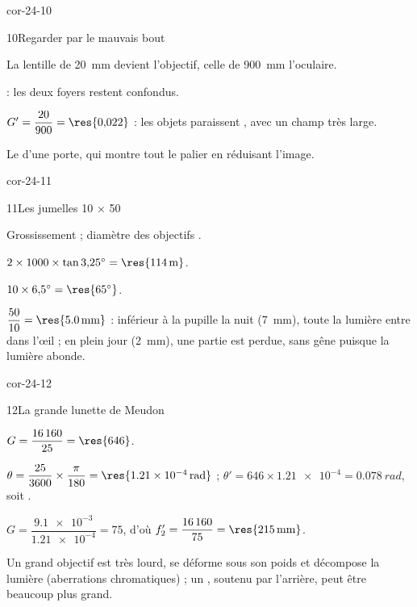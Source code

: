 \begin{blocLivre}{cor-24-10}
\begin{corrige}{10}{Regarder par le mauvais bout}
\begin{questions}
\item La lentille de \qty{20}{mm} devient l'objectif, celle de \qty{900}{mm} l'oculaire.
\item {} : les deux foyers restent confondus.
\item $G'=\dfrac{20}{900}=\res{0{,}022}$ : les objets paraissent , avec un champ très large.
\item Le  d'une porte, qui montre tout le palier en réduisant l'image.
\end{questions}
\end{corrige}
\end{blocLivre}
\begin{blocLivre}{cor-24-11}
\begin{corrige}{11}{Les jumelles 10 × 50}
\begin{questions}
\item Grossissement  ; diamètre des objectifs .
\item $2\times1000\times\tan3{,}25^\circ=\res{\qty{114}{m}}$.
\item $10\times6{,}5^\circ=\res{65^\circ}$.
\item $\dfrac{50}{10}=\res{\qty{5,0}{mm}}$ : inférieur à la pupille la nuit (\qty{7}{mm}), toute la lumière entre dans l'œil ; en
plein jour (\qty{2}{mm}), une partie est perdue, sans gêne puisque la lumière abonde.
\end{questions}
\end{corrige}
\end{blocLivre}
\begin{blocLivre}{cor-24-12}
\begin{corrige}{12}{La grande lunette de Meudon}
\begin{questions}
\item $G=\dfrac{\num{16160}}{25}=\res{646}$.
\item $\theta=\dfrac{25}{3600}\times\dfrac{\pi}{180}=\res{\qty{1,21e-4}{rad}}$ ; $\theta'=646\times\num{1.21e-4}=\qty{0,078}{rad}$, soit .
\item $G=\dfrac{\num{9.1e-3}}{\num{1.21e-4}}=75$, d'où $f'_2=\dfrac{\num{16160}}{75}=\res{\qty{215}{mm}}$.
\item Un grand objectif est très lourd, se déforme sous son poids et décompose la lumière (aberrations chromatiques) ; un
, soutenu par l'arrière, peut être beaucoup plus grand.
\end{questions}
\end{corrige}
\end{blocLivre}
